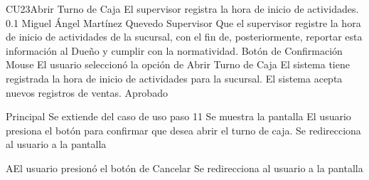 \begin{UseCase}{CU23}{Abrir Turno de Caja}
{
    El supervisor registra la hora de inicio de actividades.
}
    {
	\color{Gray} 0.1
    }
    {
	\color{Gray} Miguel \'Angel Mart\'inez Quevedo
    }
    {
	\color{Gray}
    }
    {Supervisor}
    {
	Que el supervisor registre la hora de inicio de actividades de la sucursal, con el fin de,
	posteriormente, reportar esta informaci\'on al Due\~no y cumplir con la normatividad.
    }
    {
	Bot\'on de Confirmaci\'on
    }
    {
	Mouse
    }
    {}
    {}
    {
	El usuario seleccion\'o la opci\'on de Abrir Turno de Caja
    }
    {
	El sistema tiene registrada la hora de inicio de actividades para la sucursal.
        El sistema acepta nuevos registros de ventas.
    }
    {}
    {}
    {}
    {
		Aprobado
	}
\end{UseCase}

\begin{UCtrayectoria}{Principal}
    \UCpaso Se extiende del caso de uso  paso 11
    \UCpaso Se muestra la pantalla 
    \UCpaso El usuario presiona el bot\'on  para confirmar que desea abrir el
    turno de caja.
    \UCpaso Se redirecciona al usuario a la pantalla 
\end{UCtrayectoria}

\begin{UCtrayectoriaA}{A}{El usuario presion\'o el bot\'on de Cancelar}
    \UCpaso Se redirecciona al usuario a la pantalla 
\end{UCtrayectoriaA}

